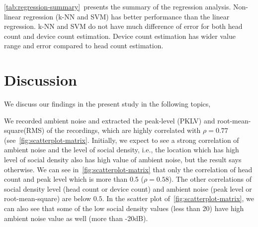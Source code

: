 \autoref{tab:regression-summary}~presents the summary of the regression analysis. Non-linear regression (\ac{k-NN} and \ac{SVM}) has better performance than the linear regression. \ac{k-NN} and \ac{SVM} do not have much difference of error for both head count and device count estimation. Device count estimation has wider value range and error compared to head count estimation.










\section{Discussion} %
\label{sec:discussion}

We discuss our findings in the present study in the following topics,



	We recorded ambient noise and extracted the peak-level (\ac{PKLV}) and root-mean-square(\ac{RMS}) of the recordings, which are highly correlated with $\rho=0.77$ (see~\autoref{fig:scatterplot-matrix}. Initially, we expect to see a strong correlation of ambient noise and the level of social density, i.e., the location which has high level of social density also has high value of ambient noise, but the result says otherwise. We can see in~\autoref{fig:scatterplot-matrix} that only the correlation of head count and peak level which is more than $0.5$ ($\rho=0.58$). The other correlations of social density level (head count or device count) and ambient noise (peak level or root-mean-square) are below $0.5$. In the scatter plot of~\autoref{fig:scatterplot-matrix}, we can also see that some of the low social density values (less than 20) have high ambient noise value as well (more than -20dB).

